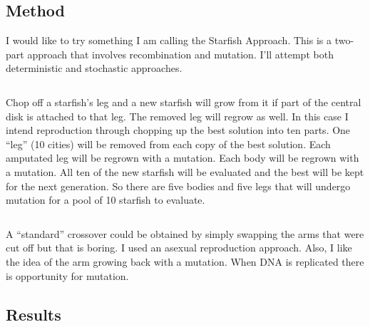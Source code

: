 \documentclass[12pt]{article}
\begin{document}
\subsection{Method}
I would like to try something I am calling the Starfish Approach. This is a 
two-part approach that involves recombination and mutation. I'll attempt both 
deterministic and stochastic approaches. 

$$$$

Chop off a starfish's leg and a new starfish will grow from it if part of the 
central disk is attached to that leg. The removed leg will regrow as well. 
In this case I intend reproduction through chopping up the best solution into 
ten parts. One ``leg'' (10 cities) will be removed from each copy of the best 
solution. Each amputated leg will be regrown with a mutation. Each body will be 
regrown with a mutation. All ten of the new starfish will be evaluated and the 
best will be kept for the next generation. So there are five bodies and five 
legs that will undergo mutation for a pool of 10 starfish to evaluate.

$$$$

A ``standard'' crossover could be obtained by simply swapping the arms that 
were cut off but that is boring. I used an asexual reproduction approach. 
Also, I like the idea of the arm growing back with a mutation. When DNA is 
replicated there is opportunity for mutation. 


\subsection{Results}
\end{document}
